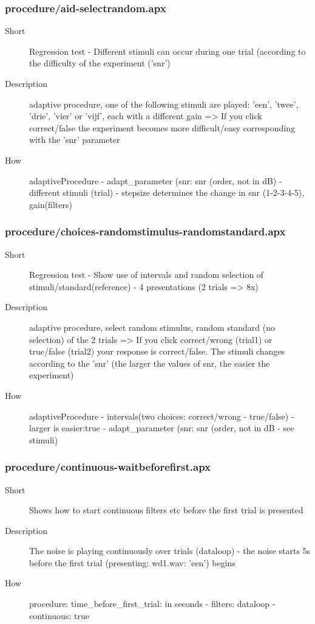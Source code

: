 \subsubsection{procedure/aid-selectrandom.apx}
\begin{description}
\item[Short] 
 Regression test - Different stimuli can occur during one trial (according to the difficulty of the experiment ('snr')
\item[Description] 
 adaptive procedure, one of the following stimuli are played: 'een', 'twee', 'drie', 'vier' or 'vijf', each with a different gain =\textgreater{} If you click correct/false the experiment becomes more difficult/easy corresponding with the 'snr' parameter
\item[How] 
 adaptiveProcedure - adapt\_parameter (snr: snr (order, not in dB) - different stimuli (trial) - stepsize determines the change in snr (1-2-3-4-5), gain(filters)
\end{description}

\subsubsection{procedure/choices-randomstimulus-randomstandard.apx}
\begin{description}
\item[Short] 
 Regression test - Show use of intervals and random selection of stimuli/standard(reference) - 4 presentations (2 trials =\textgreater{} 8x)
\item[Description] 
 adaptive procedure, select random stimulus, random standard (no selection) of the 2 trials =\textgreater{} If you click correct/wrong (trial1) or true/false (trial2) your response is correct/false. The stimuli changes according to the 'snr' (the larger the values of snr, the easier the experiment)
\item[How] 
 adaptiveProcedure - intervals(two choices: correct/wrong - true/false) - larger is easier:true - adapt\_parameter (snr: snr (order, not in dB - see stimuli)
\end{description}

\subsubsection{procedure/continuous-waitbeforefirst.apx}
\begin{description}
\item[Short] 
 Shows how to start continuous filters etc before the first trial is presented
\item[Description] 
 The noise is playing continuously over trials (dataloop)  - the noise starts 5s before the first trial (presenting: wd1.wav: 'een') begins
\item[How] 
 procedure: time\_before\_first\_trial: in seconds - filters: dataloop - continuous: true
\end{description}

